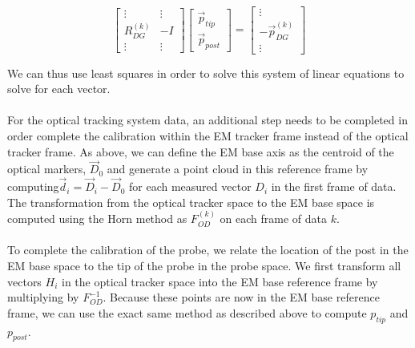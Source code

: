 \documentclass[letterpaper, 11pt]{report}
\begin{document}
$$\begin{bmatrix}
        \vdots & \vdots \\
        R_{DG}^{(k)} & -I\\
        \vdots & \vdots
    \end{bmatrix}\begin{bmatrix}
                        \vec p_{tip} \\
                        \vec p_{post}
                   \end{bmatrix} = \begin{bmatrix}
                                        \vdots \\
                                        -\vec p_{DG}^{(k)} \\
                                        \vdots
                                    \end{bmatrix}$$
                                    
We can thus use least squares in order to solve this system of linear equations to solve for each vector.
\\
\\
For the optical tracking system data, an additional step needs to be completed in order complete the calibration within the EM tracker frame instead of the optical tracker frame. As above, we can define the EM base axis as the centroid of the optical markers, $\vec D_0$ and generate a point cloud in this reference frame by computing$\vec d_i = \vec D_i - \vec D_0$ for each measured vector $D_i$ in the first frame of data. The transformation from the optical tracker space to the EM base space is computed using the Horn method as $F_{OD}^{(k)}$ on each frame of data $k$.
\\
\\
To complete the calibration of the probe, we relate the location of the post in the EM base space to the tip of the probe in the probe space. We first transform all vectors $H_i$ in the optical tracker space into the EM base reference frame by multiplying by $F_{OD}^{-1}$. Because these points are now in the EM base reference frame, we can use the exact same method as described above to compute $p_{tip}$ and $p_{post}$.
\end{document}
